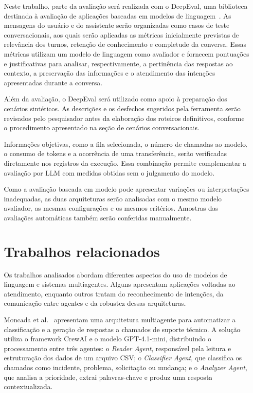 Neste trabalho, parte da avaliação será realizada com o DeepEval, uma biblioteca destinada à avaliação de aplicações baseadas em modelos de linguagem~\cite{deepeval}. As mensagens do usuário e do assistente serão organizadas como casos de teste conversacionais, aos quais serão aplicadas as métricas inicialmente previstas de relevância dos turnos, retenção de conhecimento e completude da conversa. Essas métricas utilizam um modelo de linguagem como avaliador e fornecem pontuações e justificativas para analisar, respectivamente, a pertinência das respostas ao contexto, a preservação das informações e o atendimento das intenções apresentadas durante a conversa.

Além da avaliação, o DeepEval será utilizado como apoio à preparação dos cenários sintéticos. As descrições e os desfechos sugeridos pela ferramenta serão revisados pelo pesquisador antes da elaboração dos roteiros definitivos, conforme o procedimento apresentado na seção de cenários conversacionais.

Informações objetivas, como a fila selecionada, o número de chamadas ao modelo, o consumo de tokens e a ocorrência de uma transferência, serão verificadas diretamente nos registros da execução. Essa combinação permite complementar a avaliação por LLM com medidas obtidas sem o julgamento do modelo.

Como a avaliação baseada em modelo pode apresentar variações ou interpretações inadequadas, as duas arquiteturas serão analisadas com o mesmo modelo avaliador, as mesmas configurações e os mesmos critérios. Amostras das avaliações automáticas também serão conferidas manualmente.

\section{Trabalhos relacionados}
\label{sec:trabalhos-relacionados}

Os trabalhos analisados abordam diferentes aspectos do uso de modelos de linguagem e sistemas multiagentes. Alguns apresentam aplicações voltadas ao atendimento, enquanto outros tratam do reconhecimento de intenções, da comunicação entre agentes e da robustez dessas arquiteturas.

Moncada et al.~\cite{moncada2025} apresentam uma arquitetura multiagente para automatizar a classificação e a geração de respostas a chamados de suporte técnico. A solução utiliza o framework CrewAI e o modelo GPT-4.1-mini, distribuindo o processamento entre três agentes: o \textit{Reader Agent}, responsável pela leitura e estruturação dos dados de um arquivo CSV; o \textit{Classifier Agent}, que classifica os chamados como incidente, problema, solicitação ou mudança; e o \textit{Analyzer Agent}, que analisa a prioridade, extrai palavras-chave e produz uma resposta contextualizada.

